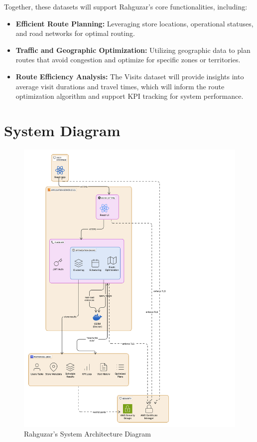 Together, these datasets will support Rahguzar’s core functionalities, including:
\begin{itemize}
    \item \textbf{Efficient Route Planning:} Leveraging store locations, operational statuses, and road networks for optimal routing.
    \item \textbf{Traffic and Geographic Optimization:} Utilizing geographic data to plan routes that avoid congestion and optimize for specific zones or territories.
    \item \textbf{Route Efficiency Analysis:} The Visits dataset will provide insights into average visit durations and travel times, which will inform the route optimization algorithm and support KPI tracking for system performance.
\end{itemize}


\section{System Diagram}
\begin{center}
        \begin{figure}[H]
        \centering
        \includegraphics[width=\textwidth, height=0.75\textheight]{images/diagram.png} 
        \caption{Rahguzar's System Architecture Diagram}
    \end{figure}
\end{center}